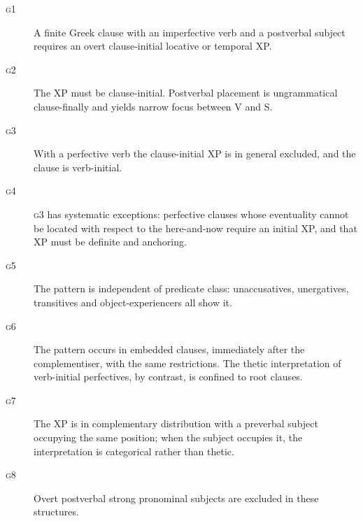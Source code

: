 \documentclass[11pt]{article}
\begin{document}
\begin{description}
\item[\textsc{g1}] A finite Greek clause with an imperfective verb and a postverbal subject requires an overt clause-initial locative or temporal XP.
\item[\textsc{g2}] The XP must be clause-initial.  Postverbal placement is ungrammatical clause-finally and yields narrow focus between V and S.
\item[\textsc{g3}] With a perfective verb the clause-initial XP is in general excluded, and the clause is verb-initial.
\item[\textsc{g4}] \textsc{g3} has systematic exceptions: perfective clauses whose eventuality cannot be located with respect to the here-and-now require an initial XP, and that XP must be definite and anchoring.
\item[\textsc{g5}] The pattern is independent of predicate class: unaccusatives, unergatives, transitives and object-experiencers all show it.
\item[\textsc{g6}] The pattern occurs in embedded clauses, immediately after the complementiser, with the same restrictions.  The thetic interpretation of verb-initial perfectives, by contrast, is confined to root clauses.
\item[\textsc{g7}] The XP is in complementary distribution with a preverbal subject occupying the same position; when the subject occupies it, the interpretation is categorical rather than thetic.
\item[\textsc{g8}] Overt postverbal strong pronominal subjects are excluded in these structures.
\end{description}
\end{document}
